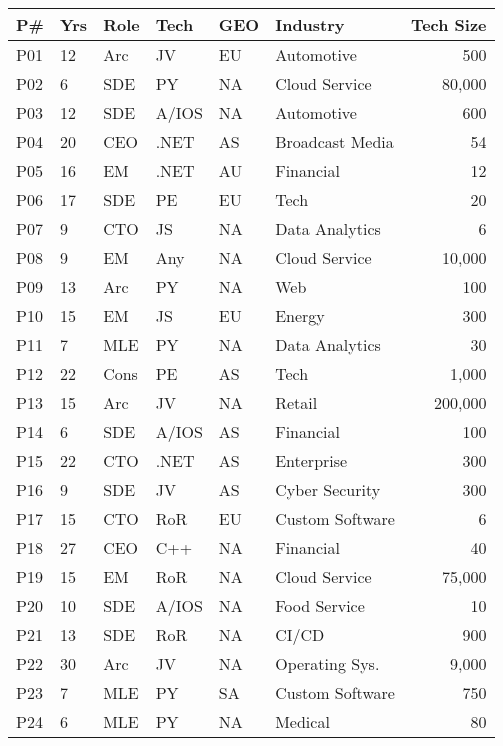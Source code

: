 

\begin{table}[]
    \centering
    \begin{tabular}{p{.4cm}p{.4cm}p{.5cm}p{.8cm}p{.5cm}p{2.2cm}r{.5cm}}%
\toprule
P\# & Yrs & Role & Tech & GEO & Industry & Tech Size \\
\midrule
P01 & 12 & Arc & JV & EU & Automotive & 500 &  \\ 
P02 & 6 & SDE & PY & NA & Cloud Service & 80,000 &  \\ 
P03 & 12 & SDE & A/IOS & NA & Automotive & 600 &  \\ 
P04 & 20 & CEO & .NET & AS & Broadcast Media & 54 &  \\ 
P05 & 16 & EM & .NET & AU & Financial & 12 &  \\ 
P06 & 17 & SDE & PE & EU & Tech & 20 &  \\ 
P07 & 9 & CTO & JS & NA & Data Analytics & 6 &  \\ 
P08 & 9 & EM & Any & NA & Cloud Service & 10,000 &  \\ 
P09 & 13 & Arc & PY & NA & Web & 100 &  \\ 
P10 & 15 & EM & JS & EU & Energy & 300 &  \\ 
P11 & 7 & MLE & PY & NA & Data Analytics & 30 &  \\ 
P12 & 22 & Cons & PE & AS & Tech & 1,000 &  \\ 
P13 & 15 & Arc & JV & NA & Retail & 200,000 &  \\ 
P14 & 6 & SDE & A/IOS & AS & Financial & 100 &  \\ 
P15 & 22 & CTO & .NET & AS & Enterprise & 300 &  \\ 
P16 & 9 & SDE & JV & AS & Cyber Security & 300 &  \\ 
P17 & 15 & CTO & RoR & EU & Custom Software & 6 &  \\ 
P18 & 27 & CEO & C++ & NA & Financial & 40 &  \\ 
P19 & 15 & EM & RoR & NA & Cloud Service & 75,000 &  \\ 
P20 & 10 & SDE & A/IOS & NA & Food Service & 10 &  \\ 
P21 & 13 & SDE & RoR & NA & CI/CD & 900 &  \\ 
P22 & 30 & Arc & JV & NA & Operating Sys. & 9,000 &  \\ 
P23 & 7 & MLE & PY & SA & Custom Software & 750 &  \\ 
P24 & 6 & MLE & PY & NA & Medical & 80 &  \\ 


\end{tabular}
\end{table}

